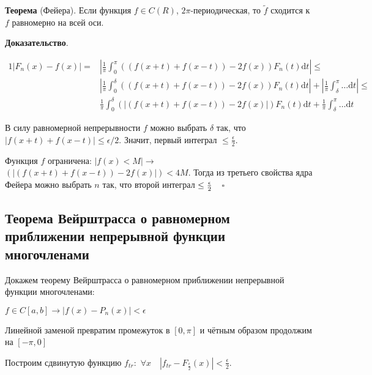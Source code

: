 \documentclass[12pt]{article}
\begin{document}
\begin{doublespace}
\textbf{Теорема} (Фейера). Если функция $f\in C(R)$, $2\pi$-периодическая,
то $\tilde{f}$ сходится к $f$ равномерно на всей оси.
\end{doublespace}

\textbf{Доказательство}.

\begin{align*}{1}
|F_{n}(x)-f(x)|= & |\frac{1}{\pi}\int_{0}^{\pi}((f(x+t)+f(x-t))-2f(x))F_{n}(t)\mathrm{d}t|\le\\
 & |\frac{1}{\pi}\int_{0}^{\delta}((f(x+t)+f(x-t))-2f(x))F_{n}(t)\mathrm{d}t|+|\frac{1}{\pi}\int_{\delta}^{\pi}\dots\mathrm{d}t|\le\\
 & \frac{1}{\pi}\int_{0}^{\delta}(|(f(x+t)+f(x-t))-2f(x)|)F_{n}(t)\mathrm{d}t+\frac{1}{\pi}\int_{\delta}^{\pi}\dots\mathrm{d}t
\end{align*}


\begin{doublespace}
В силу равномерной непрерывности $f$ можно выбрать $\delta$ так,
что $|f(x+t)+f(x-t)|\le\epsilon/2$. \hspace{2em}Значит, первый интеграл
$\le\frac{\epsilon}{2}$.

Функция $f$ ограничена: $|f(x)<M|\rightarrow$$(|(f(x+t)+f(x-t))-2f(x)|)<4M$.
Тогда из третьего свойства ядра Фейера можно выбрать $n$ так, что
второй интеграл $\text{\ensuremath{\le\frac{\epsilon}{2}}}$$\quad\square$
\end{doublespace}

\newpage

\subsection{Теорема Вейрштрасса о равномерном приближении непрерывной функции многочленами}

\begin{doublespace}
Докажем теорему Вейрштрасса о равномерном приближении непрерывной
функции многочленами:
\end{doublespace}

$f\in C[a,b]\rightarrow$$|f(x)-P_{n}(x)|<\epsilon$

\begin{doublespace}
Линейной заменой превратим промежуток в $[0,\pi]$ и чётным образом
продолжим на $[-\pi,0]$

Построим сдвинутую функцию $f_{tr}:$ $\forall x\quad|f_{tr}-F_{\frac{\epsilon}{2}}(x)|<\frac{\epsilon}{2}$.
\end{doublespace}
\end{document}
